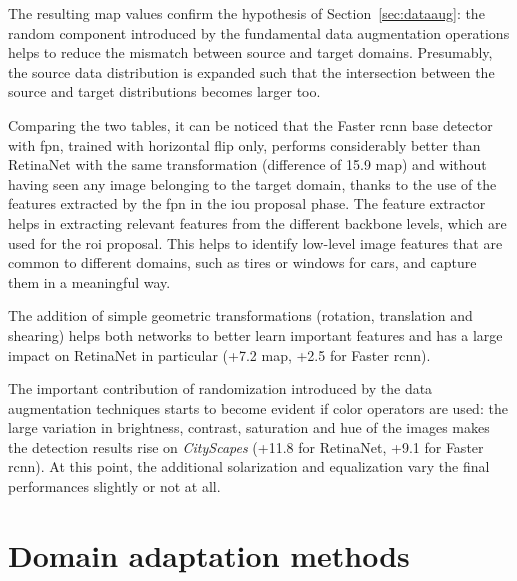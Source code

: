 \documentclass[%
    corpo=12pt,
    twoside,
    stile=classica,   
    tipotesi=magistrale,
    evenboxes,
    english,
	numerazioneromana,
]{toptesi}
\begin{document}
\bigskip
The resulting \gls{map} values confirm the hypothesis of Section~\ref{sec:dataaug}: the random component introduced by the fundamental data augmentation operations helps to reduce the mismatch between source and target domains. Presumably, the source data distribution is expanded such that the intersection between the source and target distributions becomes larger too.

\bigskip
Comparing the two tables, it can be noticed that the Faster \gls{rcnn} base detector with \gls{fpn}, trained with horizontal flip only, performs considerably better than RetinaNet with the same transformation (difference of 15.9 \gls{map}) and without having seen any image belonging to the target domain, thanks to the use of the features extracted by the \gls{fpn} in the \gls{iou} proposal phase. The feature extractor helps in extracting relevant features from the different backbone levels, which are used for the \gls{roi} proposal. This helps to identify low-level image features that are common to different domains, such as tires or windows for cars, and capture them in a meaningful way.

\medskip
The addition of simple geometric transformations (rotation, translation and shearing) helps both networks to better learn important features and has a large impact on RetinaNet in particular (+7.2 \gls{map}, +2.5 for Faster \gls{rcnn}).


\medskip
The important contribution of randomization introduced by the data augmentation techniques starts to become evident if color operators are used: the large variation in brightness, contrast, saturation and hue of the images makes the detection results rise on \textit{CityScapes} (+11.8 for RetinaNet, +9.1 for Faster \gls{rcnn}). At this point, the additional solarization and equalization vary the final performances slightly or not at all.

\section{Domain adaptation methods}
\end{document}
